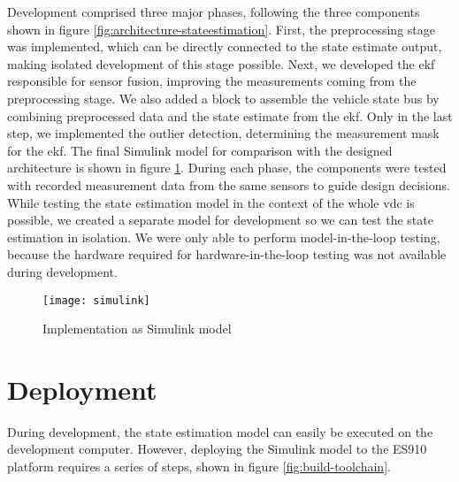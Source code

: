 Development comprised three major phases, following the three components shown in figure \ref{fig:architecture-stateestimation}. First, the preprocessing stage was implemented, which can be directly connected to the state estimate output, making isolated development of this stage possible. Next, we developed the \gls{ekf} responsible for sensor fusion, improving the measurements coming from the preprocessing stage. We also added a block to assemble the vehicle state bus by combining preprocessed data and the state estimate from the \gls{ekf}. Only in the last step, we implemented the outlier detection, determining the measurement mask for the \gls{ekf}. The final Simulink model for comparison with the designed architecture is shown in figure \ref{fig:simulink}. During each phase, the components were tested with recorded measurement data from the same sensors to guide design decisions. While testing the state estimation model in the context of the whole \gls{vdc} is possible, we created a separate model for development so we can test the state estimation in isolation. We were only able to perform model-in-the-loop testing, because the hardware required for hardware-in-the-loop testing was not available during development.

\begin{figure}
	\centering
	\texttt{[image: simulink]}%
	\caption{Implementation as Simulink model}
	\label{fig:simulink}
\end{figure}


\section{Deployment}
During development, the state estimation model can easily be executed on the development computer. However, deploying the Simulink model to the ES910 platform requires a series of steps, shown in figure \ref{fig:build-toolchain}.

